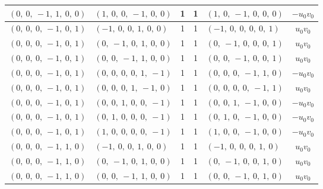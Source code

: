 \documentclass[11pt]{article}
\theoremstyle{definition}
\begin{document}
\begin{longtable}{|l|l|c|c|l|c|}
    \hline
    $\left( 0, \  0, \  -1, \  1, \  0, \  0\right)$ & $\left( 1, \  0, \  0, \  -1, \  0, \  0\right)$ & 1 & 1 & $\left( 1, \  0, \  -1, \  0, \  0, \  0\right)$ & $- u_{0} v_{0}$ \\
    \hline
    $\left( 0, \  0, \  0, \  -1, \  0, \  1\right)$ & $\left( -1, \  0, \  0, \  1, \  0, \  0\right)$ & 1 & 1 & $\left( -1, \  0, \  0, \  0, \  0, \  1\right)$ & $u_{0} v_{0}$ \\
    \hline
    $\left( 0, \  0, \  0, \  -1, \  0, \  1\right)$ & $\left( 0, \  -1, \  0, \  1, \  0, \  0\right)$ & 1 & 1 & $\left( 0, \  -1, \  0, \  0, \  0, \  1\right)$ & $u_{0} v_{0}$ \\
    \hline
    $\left( 0, \  0, \  0, \  -1, \  0, \  1\right)$ & $\left( 0, \  0, \  -1, \  1, \  0, \  0\right)$ & 1 & 1 & $\left( 0, \  0, \  -1, \  0, \  0, \  1\right)$ & $u_{0} v_{0}$ \\
    \hline
    $\left( 0, \  0, \  0, \  -1, \  0, \  1\right)$ & $\left( 0, \  0, \  0, \  0, \  1, \  -1\right)$ & 1 & 1 & $\left( 0, \  0, \  0, \  -1, \  1, \  0\right)$ & $- u_{0} v_{0}$ \\
    \hline
    $\left( 0, \  0, \  0, \  -1, \  0, \  1\right)$ & $\left( 0, \  0, \  0, \  1, \  -1, \  0\right)$ & 1 & 1 & $\left( 0, \  0, \  0, \  0, \  -1, \  1\right)$ & $u_{0} v_{0}$ \\
    \hline
    $\left( 0, \  0, \  0, \  -1, \  0, \  1\right)$ & $\left( 0, \  0, \  1, \  0, \  0, \  -1\right)$ & 1 & 1 & $\left( 0, \  0, \  1, \  -1, \  0, \  0\right)$ & $- u_{0} v_{0}$ \\
    \hline
    $\left( 0, \  0, \  0, \  -1, \  0, \  1\right)$ & $\left( 0, \  1, \  0, \  0, \  0, \  -1\right)$ & 1 & 1 & $\left( 0, \  1, \  0, \  -1, \  0, \  0\right)$ & $- u_{0} v_{0}$ \\
    \hline
    $\left( 0, \  0, \  0, \  -1, \  0, \  1\right)$ & $\left( 1, \  0, \  0, \  0, \  0, \  -1\right)$ & 1 & 1 & $\left( 1, \  0, \  0, \  -1, \  0, \  0\right)$ & $- u_{0} v_{0}$ \\
    \hline
    $\left( 0, \  0, \  0, \  -1, \  1, \  0\right)$ & $\left( -1, \  0, \  0, \  1, \  0, \  0\right)$ & 1 & 1 & $\left( -1, \  0, \  0, \  0, \  1, \  0\right)$ & $u_{0} v_{0}$ \\
    \hline
    $\left( 0, \  0, \  0, \  -1, \  1, \  0\right)$ & $\left( 0, \  -1, \  0, \  1, \  0, \  0\right)$ & 1 & 1 & $\left( 0, \  -1, \  0, \  0, \  1, \  0\right)$ & $u_{0} v_{0}$ \\
    \hline
    $\left( 0, \  0, \  0, \  -1, \  1, \  0\right)$ & $\left( 0, \  0, \  -1, \  1, \  0, \  0\right)$ & 1 & 1 & $\left( 0, \  0, \  -1, \  0, \  1, \  0\right)$ & $u_{0} v_{0}$ \\

\end{longtable}
\end{document}

